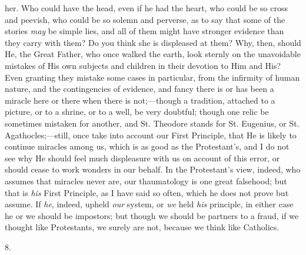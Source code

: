 her. Who could have the head, even if he had the heart,
who could be so cross and peevish, who could be so solemn
and perverse, as to say that some of the stories \emph{may}
be simple lies, and all of them might have stronger
evidence than they carry with them? Do you think she is
displeased at them? Why, then, should He, the Great
Father, who once walked the earth, look sternly on the
unavoidable mistakes of His own subjects and children in
their devotion to Him and His? Even granting they mistake
some cases in particular, from the infirmity of human
nature, and the contingencies of evidence, and fancy
there is or has been a miracle here or there when there
is not;—though a tradition, attached to a picture,
or to a shrine, or to a well, be very doubtful; though
one relic be sometimes mistaken for another, and St.
Theodore stands for St. Eugenius, or St.
Agathocles;—still, once take into account our First
Principle, that He is likely to continue miracles among
us, which is as good as the Protestant's, and I do not
see why He should feel much displeasure with us on
account of this error, or should cease to work wonders in
our behalf. In the Protestant's view, indeed, who assumes
that miracles never are, our thaumatology is one great
falsehood; but that is \emph{his} First Principle, as I
have said so often, which he does not prove but assume.
If \emph{he}, indeed, upheld \emph{our} system, or \emph{we}
held \emph{his} principle, in either case he or we
should be impostors; but though we should be partners to
a fraud, if we thought like Protestants, we surely are
not, because we think like Catholics.

8.

